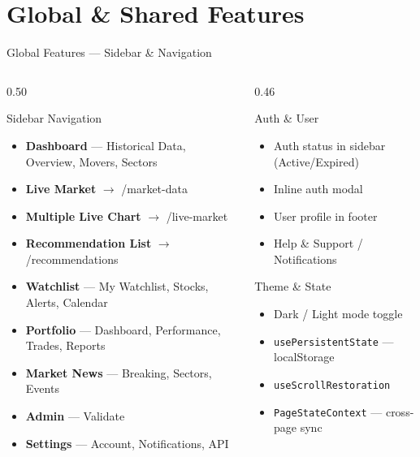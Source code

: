 \documentclass[aspectratio=169, 11pt]{beamer}
\begin{document}
\section{Global \& Shared Features}
\begin{frame}{Global Features — Sidebar \& Navigation}
\begin{columns}[T]
\begin{column}{0.50\textwidth}
\begin{block}{Sidebar Navigation}
\begin{itemize}
  \item \textbf{Dashboard} — Historical Data, Overview, Movers, Sectors
  \item \textbf{Live Market} $\rightarrow$ /market-data
  \item \textbf{Multiple Live Chart} $\rightarrow$ /live-market
  \item \textbf{Recommendation List} $\rightarrow$ /recommendations
  \item \textbf{Watchlist} — My Watchlist, Stocks, Alerts, Calendar
  \item \textbf{Portfolio} — Dashboard, Performance, Trades, Reports
  \item \textbf{Market News} — Breaking, Sectors, Events
  \item \textbf{Admin} — Validate
  \item \textbf{Settings} — Account, Notifications, API
\end{itemize}
\end{block}
\end{column}
\begin{column}{0.46\textwidth}
\begin{block}{Auth \& User}
\begin{itemize}
  \item Auth status in sidebar (Active/Expired)
  \item Inline auth modal
  \item User profile in footer
  \item Help \& Support / Notifications
\end{itemize}
\end{block}
\vspace{0.3cm}
\begin{exampleblock}{Theme \& State}
\begin{itemize}
  \item Dark / Light mode toggle
  \item \texttt{usePersistentState} — localStorage
  \item \texttt{useScrollRestoration}
  \item \texttt{PageStateContext} — cross-page sync
\end{itemize}
\end{exampleblock}
\end{column}
\end{columns}
\end{frame}
\end{document}
